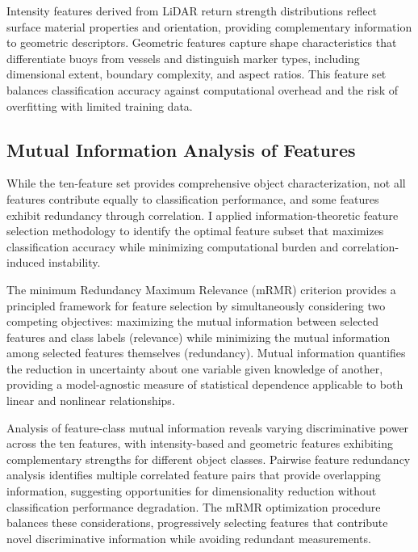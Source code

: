 \documentclass{erauthesis}
\begin{document}
Intensity features derived from \ac{LiDAR} return strength distributions reflect surface material properties and orientation, providing complementary information to geometric descriptors.
Geometric features capture shape characteristics that differentiate buoys from vessels and distinguish marker types, including dimensional extent, boundary complexity, and aspect ratios.
This feature set balances classification accuracy against computational overhead and the risk of overfitting with limited training data.

\subsection{Mutual Information Analysis of Features} \label{sec:gbcache_MI_features}

While the ten-feature set provides comprehensive object characterization, not all features contribute equally to classification performance, and some features exhibit redundancy through correlation.
I applied information-theoretic feature selection methodology to identify the optimal feature subset that maximizes classification accuracy while minimizing computational burden and correlation-induced instability.

The minimum Redundancy Maximum Relevance (mRMR) criterion provides a principled framework for feature selection by simultaneously considering two competing objectives: maximizing the mutual information between selected features and class labels (relevance) while minimizing the mutual information among selected features themselves (redundancy).
Mutual information quantifies the reduction in uncertainty about one variable given knowledge of another, providing a model-agnostic measure of statistical dependence applicable to both linear and nonlinear relationships.

Analysis of feature-class mutual information reveals varying discriminative power across the ten features, with intensity-based and geometric features exhibiting complementary strengths for different object classes.
Pairwise feature redundancy analysis identifies multiple correlated feature pairs that provide overlapping information, suggesting opportunities for dimensionality reduction without classification performance degradation.
The mRMR optimization procedure balances these considerations, progressively selecting features that contribute novel discriminative information while avoiding redundant measurements.
\end{document}
